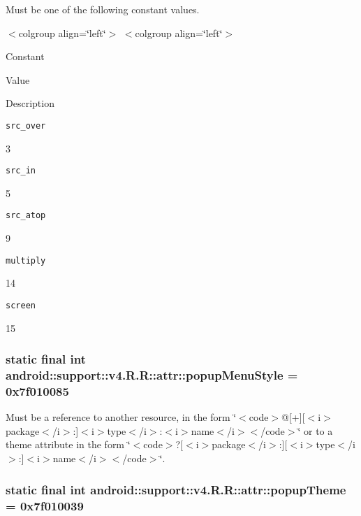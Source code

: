 Must be one of the following constant values. \begin{TabularC}{0}
\hline
\end{TabularC}
$<$colgroup align=\char`\"{}left\char`\"{}$>$ $<$colgroup align=\char`\"{}left\char`\"{}$>$ 

Constant

Value

Description 

{\tt src\_\-over}

3

{\tt src\_\-in}

5

{\tt src\_\-atop}

9

{\tt multiply}

14

{\tt screen}

15\hypertarget{classandroid_1_1support_1_1v4_1_1_r_1_1attr_29ff6e708810965e91a22ace7fe9316b}{
\subsubsection[{popupMenuStyle}]{\setlength{\rightskip}{0pt plus 5cm}static final int android::support::v4.R.R::attr::popupMenuStyle = 0x7f010085}}
\label{classandroid_1_1support_1_1v4_1_1_r_1_1attr_29ff6e708810965e91a22ace7fe9316b}


Must be a reference to another resource, in the form \char`\"{}$<$code$>$@\mbox{[}+\mbox{]}\mbox{[}$<$i$>$package$<$/i$>$:\mbox{]}$<$i$>$type$<$/i$>$:$<$i$>$name$<$/i$>$$<$/code$>$\char`\"{} or to a theme attribute in the form \char`\"{}$<$code$>$?\mbox{[}$<$i$>$package$<$/i$>$:\mbox{]}\mbox{[}$<$i$>$type$<$/i$>$:\mbox{]}$<$i$>$name$<$/i$>$$<$/code$>$\char`\"{}. \hypertarget{classandroid_1_1support_1_1v4_1_1_r_1_1attr_94400b57cffe4fbfe3647adbad35ccdc}{
\subsubsection[{popupTheme}]{\setlength{\rightskip}{0pt plus 5cm}static final int android::support::v4.R.R::attr::popupTheme = 0x7f010039}}
\label{classandroid_1_1support_1_1v4_1_1_r_1_1attr_94400b57cffe4fbfe3647adbad35ccdc}


